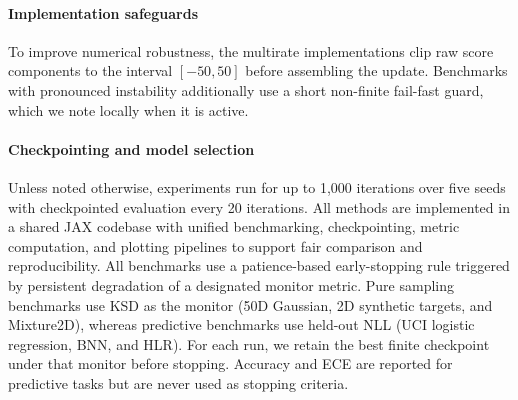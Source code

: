 \paragraph{Implementation safeguards}
To improve numerical robustness, the multirate implementations clip raw score
components to the interval $[-50,50]$ before assembling the update. Benchmarks
with pronounced instability additionally use a short non-finite fail-fast
guard, which we note locally when it is active.

\paragraph{Checkpointing and model selection}
Unless noted otherwise, experiments run for up to 1,000 iterations over five
seeds with checkpointed evaluation every 20 iterations. All methods are
implemented in a shared JAX codebase with unified benchmarking, checkpointing,
metric computation, and plotting pipelines to support fair comparison and
reproducibility. All benchmarks use a patience-based early-stopping rule
triggered by persistent degradation of a designated monitor metric. Pure sampling benchmarks use KSD as the monitor
(50D Gaussian, 2D synthetic targets, and Mixture2D), whereas predictive
benchmarks use held-out NLL (UCI logistic regression, BNN, and HLR). For each
run, we retain the best finite checkpoint under that monitor before stopping.
Accuracy and ECE are reported for predictive tasks but are never used as
stopping criteria.

